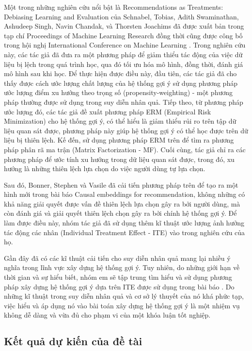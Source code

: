 \documentclass{article}[14pt]
\begin{document}
{    
    Một trong những nghiên cứu nổi bật là {Recommendations as Treatments: Debiasing Learning and Evaluation} của Schnabel, Tobias, Adith Swaminathan, Ashudeep Singh, Navin Chandak, và Thorsten Joachims đã được xuất bản trong tạp chí {Proceedings of Machine Learning Research} đồng thời cũng được công bố trong hội nghị {International Conference on Machine Learning} \cite{pmlr}. Trong nghiên cứu này, các tác giả đã đưa ra một phương pháp để giảm thiểu tác động của việc dữ liệu bị lệch trong quá trình học, qua đó tối ưu hóa mô hình, đồng thời, đánh giá mô hình sau khi học. Để thực hiện được điều này,  đầu tiên, các tác giả đã cho thấy được cách ước lượng chất lượng của hệ thống gợi ý sử dụng phương pháp ước lượng điểm xu hướng theo trọng số (propensity-weighting) - một phương pháp thường được sử dụng trong suy diễn nhân quả. Tiếp theo, từ phương pháp ước lượng đó, các tác giả đề xuất phương pháp ERM (Empirical Risk Minimization) cho hệ thống gợi ý, có thể hiểu là giảm thiểu rủi ro trên tập dữ liệu quan sát được, phương pháp này giúp  hệ thống gợi ý có thể học được trên dữ liệu bị thiên lệch. Kế đến, sử dụng phương pháp ERM trên để tìm ra phương pháp  phân rã ma trận (Matrix Factorization - MF). Cuối cùng, tác giả chỉ ra các phương pháp để ước tính xu hướng trong dữ liệu quan sát được, trong đó, xu hướng là những thiên lệch lựa chọn do việc người dùng tự lựa chọn.
    
    Sau đó, Bonner, Stephen và Vasile đã cải tiến phương pháp trên để tạo ra một hình mới trong bài báo Causal embeddings for recommendation\cite{cause}, không những có khả năng giải quyết được vấn đề thiên lệch lựa chọn gây ra bởi người dùng, mà còn đánh giá và giải quyết thiên lệch chọn gây ra bởi chính hệ thống gợi ý. Để làm được điều này, nhóm tác giả đã sử dụng thêm kĩ thuật ước lượng ảnh hưởng tác động các nhân (Individual Treatment Effect - ITE)  \cite{rubin} vào trong nghiên cứu của họ.
    
    Gần đây đã có các kĩ thuật cải tiến cho suy diễn nhân quả mang lại nhiều ý nghĩa trong lĩnh vực xây dựng hệ thống gợi ý. Tuy nhiên, do những giới hạn về thời gian và sự hiểu biết, nhóm em sẽ tập trung tìm hiểu và sử dụng phương pháp xây dựng hệ thống gợi ý dựa trên ITE được sử dụng trong bài báo \cite{cause}. Do những kĩ thuật trong suy diễn nhân quả và cơ sở lý thuyết của nó khá phức tạp, việc hiểu và áp dụng nó vào bài toán xây dựng hệ thống gợi ý là một nhiệm vụ không dễ dàng và vừa đủ cho phạm vi của một khóa luận tốt nghiệp.

    
    \subsection{Kết quả dự kiến của đề tài}
        
}
\end{document}
